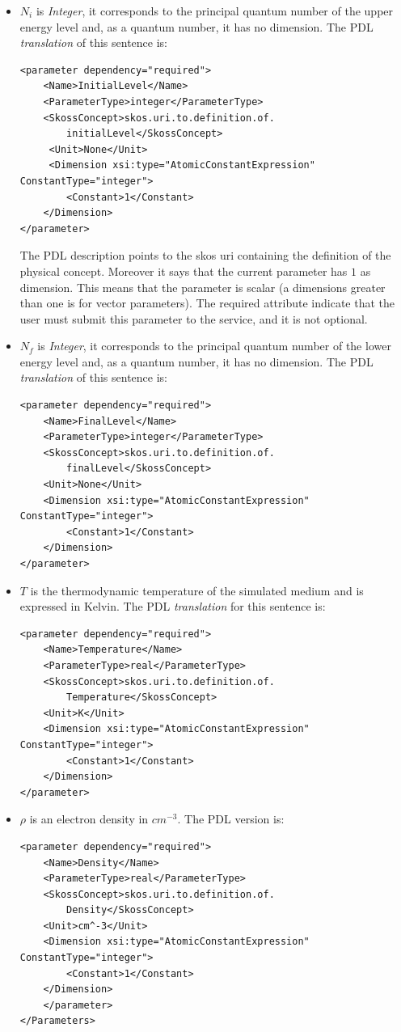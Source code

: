 \documentclass[a4paper,11pt] {ivoa}
\begin{document}
\begin{itemize}
\item $N_i$ is {\it Integer}, it corresponds to the principal quantum number of the upper energy level and, as a quantum number, it has no dimension. The PDL {\it translation} of this sentence is:
\begin{lstlisting}[style=listXML]
<parameter dependency="required">
	<Name>InitialLevel</Name>
	<ParameterType>integer</ParameterType>
	<SkossConcept>skos.uri.to.definition.of.
		initialLevel</SkossConcept>
	 <Unit>None</Unit>
	 <Dimension xsi:type="AtomicConstantExpression" ConstantType="integer">
		<Constant>1</Constant>
	</Dimension>
</parameter>
\end{lstlisting}
The PDL description points to the skos uri containing the definition of the physical concept. Moreover it says that the current parameter has $1$ as dimension. This means that the parameter is scalar (a dimensions greater than one is for vector parameters). The required attribute indicate that the user must submit this parameter to the service, and it is not optional.

\item $N_f$ is {\it Integer}, it corresponds to the principal quantum number of the lower energy level and, as a quantum number, it has no dimension. The PDL {\it translation} of this sentence is:
\begin{lstlisting}[style=listXML]
<parameter dependency="required">
	<Name>FinalLevel</Name>
	<ParameterType>integer</ParameterType>	
	<SkossConcept>skos.uri.to.definition.of.
		finalLevel</SkossConcept>	
	<Unit>None</Unit>
	<Dimension xsi:type="AtomicConstantExpression" ConstantType="integer">
		<Constant>1</Constant>
	</Dimension>
</parameter>
\end{lstlisting}

\item $T$ is the thermodynamic temperature of the simulated medium and is expressed in Kelvin. The PDL {\it translation} for this sentence is:
\begin{lstlisting}[style=listXML]
<parameter dependency="required">
	<Name>Temperature</Name>
	<ParameterType>real</ParameterType>
	<SkossConcept>skos.uri.to.definition.of.
		Temperature</SkossConcept>
	<Unit>K</Unit>
	<Dimension xsi:type="AtomicConstantExpression" ConstantType="integer">
		<Constant>1</Constant>
	</Dimension>
</parameter>
\end{lstlisting}
\item $\rho$ is an electron density in $cm^{-3}$. The PDL version is:
\begin{lstlisting}[style=listXML]
<parameter dependency="required">
	<Name>Density</Name>
	<ParameterType>real</ParameterType>
	<SkossConcept>skos.uri.to.definition.of.
		Density</SkossConcept>
	<Unit>cm^-3</Unit>
	<Dimension xsi:type="AtomicConstantExpression" ConstantType="integer">
		<Constant>1</Constant>
	</Dimension>
	</parameter>
</Parameters>
\end{lstlisting}
\end{itemize} 
\end{document}
